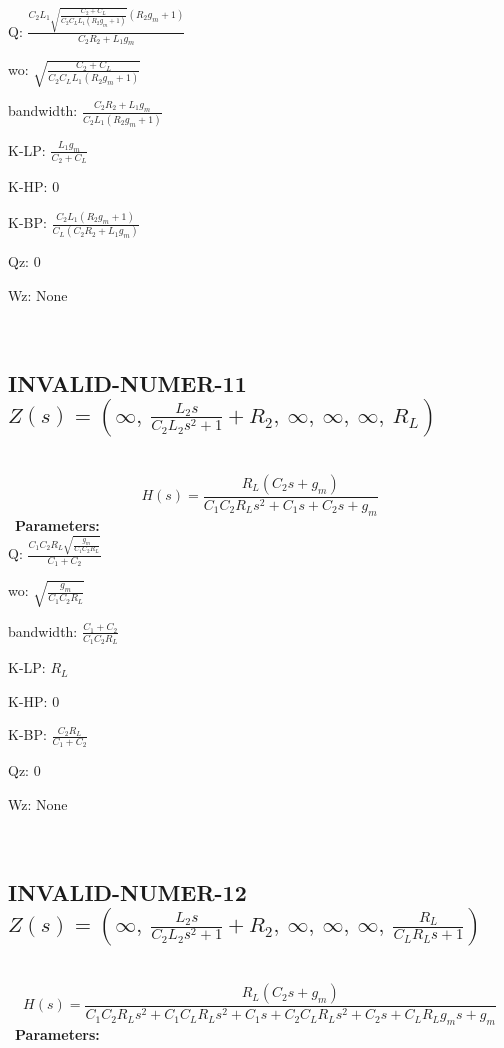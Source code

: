 \documentclass{article}
\begin{document}
Q: $\frac{C_{2} L_{1} \sqrt{\frac{C_{2} + C_{L}}{C_{2} C_{L} L_{1} \left(R_{2} g_{m} + 1\right)}} \left(R_{2} g_{m} + 1\right)}{C_{2} R_{2} + L_{1} g_{m}}$\ 

wo: $\sqrt{\frac{C_{2} + C_{L}}{C_{2} C_{L} L_{1} \left(R_{2} g_{m} + 1\right)}}$\ 

bandwidth: $\frac{C_{2} R_{2} + L_{1} g_{m}}{C_{2} L_{1} \left(R_{2} g_{m} + 1\right)}$\ 

K-LP: $\frac{L_{1} g_{m}}{C_{2} + C_{L}}$\ 

K-HP: $0$\ 

K-BP: $\frac{C_{2} L_{1} \left(R_{2} g_{m} + 1\right)}{C_{L} \left(C_{2} R_{2} + L_{1} g_{m}\right)}$\ 

Qz: $0$\ 

Wz: $\text{None}$\ 

\ 

\subsection{INVALID-NUMER-11 $Z(s) = \left( \infty, \  \frac{L_{2} s}{C_{2} L_{2} s^{2} + 1} + R_{2}, \  \infty, \  \infty, \  \infty, \  R_{L}\right)$ } \ 
\textbf{\[H(s) = \frac{R_{L} \left(C_{2} s + g_{m}\right)}{C_{1} C_{2} R_{L} s^{2} + C_{1} s + C_{2} s + g_{m}}\] } \ 
\textbf{Parameters:}\\ 

Q: $\frac{C_{1} C_{2} R_{L} \sqrt{\frac{g_{m}}{C_{1} C_{2} R_{L}}}}{C_{1} + C_{2}}$\ 

wo: $\sqrt{\frac{g_{m}}{C_{1} C_{2} R_{L}}}$\ 

bandwidth: $\frac{C_{1} + C_{2}}{C_{1} C_{2} R_{L}}$\ 

K-LP: $R_{L}$\ 

K-HP: $0$\ 

K-BP: $\frac{C_{2} R_{L}}{C_{1} + C_{2}}$\ 

Qz: $0$\ 

Wz: $\text{None}$\ 

\ 

\subsection{INVALID-NUMER-12 $Z(s) = \left( \infty, \  \frac{L_{2} s}{C_{2} L_{2} s^{2} + 1} + R_{2}, \  \infty, \  \infty, \  \infty, \  \frac{R_{L}}{C_{L} R_{L} s + 1}\right)$ } \ 
\textbf{\[H(s) = \frac{R_{L} \left(C_{2} s + g_{m}\right)}{C_{1} C_{2} R_{L} s^{2} + C_{1} C_{L} R_{L} s^{2} + C_{1} s + C_{2} C_{L} R_{L} s^{2} + C_{2} s + C_{L} R_{L} g_{m} s + g_{m}}\] } \ 
\textbf{Parameters:}\\ 
\end{document}
